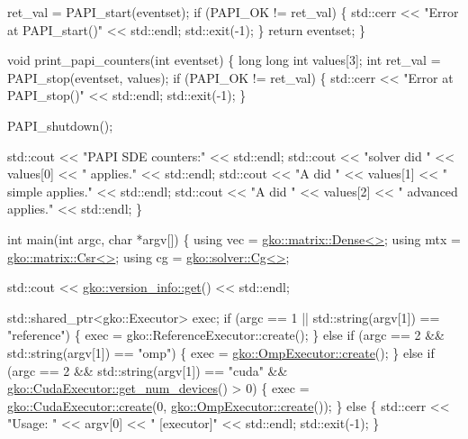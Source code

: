 \begin{DoxyCodeInclude}
    ret\_val = PAPI\_start(eventset);
    \textcolor{keywordflow}{if} (PAPI\_OK != ret\_val) \{
        std::cerr << \textcolor{stringliteral}{"Error at PAPI\_start()"} << std::endl;
        std::exit(-1);
    \}
    \textcolor{keywordflow}{return} eventset;
\}


\textcolor{keywordtype}{void} print\_papi\_counters(\textcolor{keywordtype}{int} eventset)
\{
    \textcolor{keywordtype}{long} \textcolor{keywordtype}{long} \textcolor{keywordtype}{int} values[3];
    \textcolor{keywordtype}{int} ret\_val = PAPI\_stop(eventset, values);
    \textcolor{keywordflow}{if} (PAPI\_OK != ret\_val) \{
        std::cerr << \textcolor{stringliteral}{"Error at PAPI\_stop()"} << std::endl;
        std::exit(-1);
    \}

    PAPI\_shutdown();

    std::cout << \textcolor{stringliteral}{"PAPI SDE counters:"} << std::endl;
    std::cout << \textcolor{stringliteral}{"solver did "} << values[0] << \textcolor{stringliteral}{" applies."} << std::endl;
    std::cout << \textcolor{stringliteral}{"A did "} << values[1] << \textcolor{stringliteral}{" simple applies."} << std::endl;
    std::cout << \textcolor{stringliteral}{"A did "} << values[2] << \textcolor{stringliteral}{" advanced applies."} << std::endl;
\}


\textcolor{keywordtype}{int} main(\textcolor{keywordtype}{int} argc, \textcolor{keywordtype}{char} *argv[])
\{
    \textcolor{keyword}{using} vec = \hyperlink{classgko_1_1matrix_1_1Dense}{gko::matrix::Dense<>};
    \textcolor{keyword}{using} mtx = \hyperlink{classgko_1_1matrix_1_1Csr}{gko::matrix::Csr<>};
    \textcolor{keyword}{using} cg = \hyperlink{classgko_1_1solver_1_1Cg}{gko::solver::Cg<>};

    std::cout << \hyperlink{classgko_1_1version__info_a6daeb8a087cfb57fa055526fc133d8eb}{gko::version\_info::get}() << std::endl;

    std::shared\_ptr<gko::Executor> exec;
    \textcolor{keywordflow}{if} (argc == 1 || std::string(argv[1]) == \textcolor{stringliteral}{"reference"}) \{
        exec = gko::ReferenceExecutor::create();
    \} \textcolor{keywordflow}{else} \textcolor{keywordflow}{if} (argc == 2 && std::string(argv[1]) == \textcolor{stringliteral}{"omp"}) \{
        exec = \hyperlink{classgko_1_1OmpExecutor_a33ca05fdd0fc928ee262fc9425304874}{gko::OmpExecutor::create}();
    \} \textcolor{keywordflow}{else} \textcolor{keywordflow}{if} (argc == 2 && std::string(argv[1]) == \textcolor{stringliteral}{"cuda"} &&
               \hyperlink{classgko_1_1CudaExecutor_aef0258494d14de0e56149b920c5173e5}{gko::CudaExecutor::get\_num\_devices}() > 0) \{
        exec = \hyperlink{classgko_1_1CudaExecutor_a2718a92034350650ef406ffdb60db090}{gko::CudaExecutor::create}(0, 
      \hyperlink{classgko_1_1OmpExecutor_a33ca05fdd0fc928ee262fc9425304874}{gko::OmpExecutor::create}());
    \} \textcolor{keywordflow}{else} \{
        std::cerr << \textcolor{stringliteral}{"Usage: "} << argv[0] << \textcolor{stringliteral}{" [executor]"} << std::endl;
        std::exit(-1);
    \}


\end{DoxyCodeInclude}
